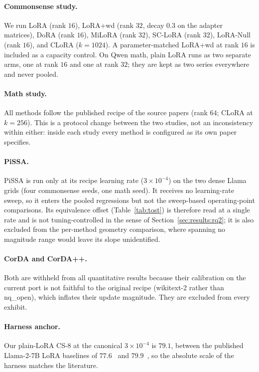 \documentclass[11pt]{article}
\begin{document}
\paragraph{Commonsense study.} We run LoRA (rank $16$), LoRA{+}wd (rank $32$,
decay $0.3$ on the adapter matrices), DoRA (rank $16$), MiLoRA (rank $32$),
SC-LoRA (rank $32$), LoRA-Null (rank $16$), and CLoRA ($k{=}1024$). A
parameter-matched LoRA{+}wd at rank $16$ is included as a capacity control. On
Qwen math, plain LoRA runs as two separate arms, one at rank $16$ and one at
rank $32$; they are kept as two series everywhere and never pooled.

\paragraph{Math study.} All methods follow the published recipe of the source
papers (rank $64$; CLoRA at $k{=}256$). This is a protocol change between the
two studies, not an inconsistency within either: inside each study every
method is configured as its own paper specifies.

\paragraph{PiSSA.} PiSSA is run only at its recipe learning rate
($3\!\times\!10^{-4}$) on the two dense Llama grids (four commonsense seeds,
one math seed). It receives no learning-rate sweep, so it enters the pooled
regressions but not the sweep-based operating-point comparisons. Its
equivalence offset (Table~\ref{tab:tost}) is therefore read at a single rate
and is not tuning-controlled in the sense of
Section~\ref{sec:results:rq2}; it is also excluded from the per-method
geometry comparison, where spanning no magnitude range would leave its slope
unidentified.

\paragraph{CorDA and CorDA{+}{+}.} Both are withheld from all quantitative
results because their calibration on the current port is not faithful to the
original recipe (wikitext-2 rather than nq\_open), which inflates their update
magnitude. They are excluded from every exhibit.

\paragraph{Harness anchor.} Our plain-LoRA CS-8 at the canonical
$3\times10^{-4}$ is $79.1$, between the published Llama-2-7B LoRA baselines of
$77.6$~\citep{liu2024dora} and $79.9$~\citep{clora}, so the absolute scale of
the harness matches the literature.
\end{document}
